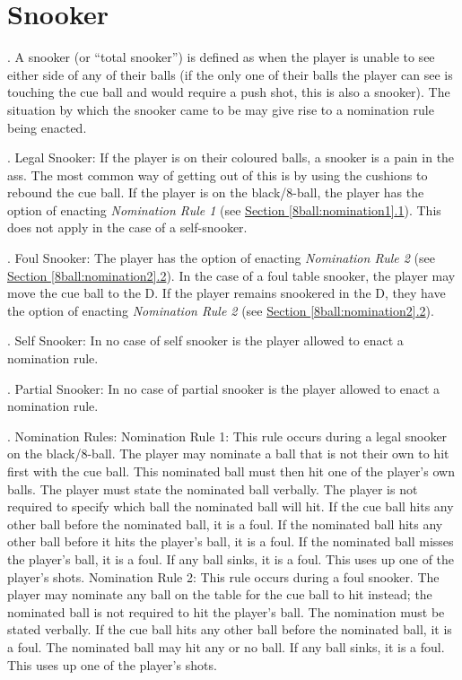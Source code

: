 \section{Snooker} \label{8ball:snooker}
\ex. A snooker (or “total snooker”) is defined as when the player is unable to see either side of any of their balls (if the only one of their balls the player can see is touching the cue ball and would require a push shot, this is also a snooker). The situation by which the snooker came to be may give rise to a nomination rule being enacted.\par
\ex. Legal Snooker:\itemspace
{}If the player is on their coloured balls, a snooker is a pain in the ass. The most common way of getting out of this is by using the cushions to rebound the cue ball.\itemspace
{}If the player is on the black/8-ball, the player has the option of enacting \emph{Nomination Rule 1} (see \hyperref[8ball:nomination1]{Section \ref*{8ball:nomination1}.1}). This does not apply in the case of a self-snooker.
\par
\ex. Foul Snooker:\itemspace
{}The player has the option of enacting \emph{Nomination Rule 2} (see \hyperref[8ball:nomination2]{Section \ref*{8ball:nomination2}.2}).\itemspace
{}In the case of a foul table snooker, the player may move the cue ball to the D. If the player remains snookered in the D, they have the option of enacting \emph{Nomination Rule 2} (see \hyperref[8ball:nomination2]{Section \ref*{8ball:nomination2}.2}).
\par
\ex. Self Snooker: In no case of self snooker is the player allowed to enact a nomination rule.\par
\ex. Partial Snooker: In no case of partial snooker is the player allowed to enact a nomination rule.\par
\ex. Nomination Rules:\itemspace
{}\label{8ball:nomination1}Nomination Rule 1: This rule occurs during a legal snooker on the black/8-ball. The player may nominate a ball that is not their own to hit first with the cue ball. This nominated ball must then hit one of the player's own balls. The player must state the nominated ball verbally. The player is not required to specify which ball the nominated ball will hit. If the cue ball hits any other ball before the nominated ball, it is a foul. If the nominated ball hits any other ball before it hits the player's ball, it is a foul. If the nominated ball misses the player's ball, it is a foul. If any ball sinks, it is a foul. This uses up one of the player's shots.\itemspace
{}\label{8ball:nomination2}Nomination Rule 2: This rule occurs during a foul snooker. The player may nominate any ball on the table for the cue ball to hit instead; the nominated ball is not required to hit the player's ball. The nomination must be stated verbally. If the cue ball hits any other ball before the nominated ball, it is a foul. The nominated ball may hit any or no ball. If any ball sinks, it is a foul. This uses up one of the player's shots.
\par

